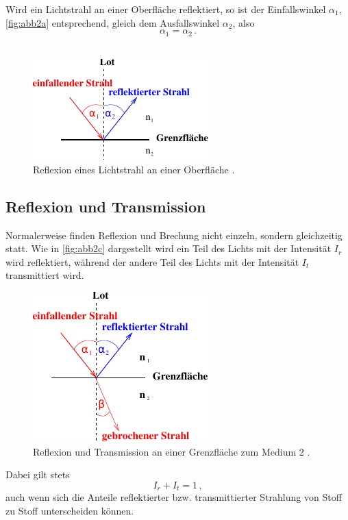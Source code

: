 Wird ein Lichtstrahl an einer Oberfläche reflektiert, so ist der Einfallswinkel $\alpha_1$, \autoref{fig:abb2a} entsprechend, gleich dem Ausfallswinkel $\alpha_2$, also
\begin{equation}
    \alpha_1 = \alpha_2 \,.
    \label{eq:reflexion}
\end{equation} \\

\begin{figure}
    \centering
    \includegraphics{figures/Abb_2a.pdf}
    \caption{Reflexion eines Lichtstrahl an einer Oberfläche \cite{ap02}.}
    \label{fig:abb2a}
\end{figure}

\subsection*{Reflexion und Transmission}

Normalerweise finden Reflexion und Brechung nicht einzeln, sondern gleichzeitig statt. Wie in \autoref{fig:abb2c} dargestellt wird ein Teil des Lichts mit der Intensität $I_r$ wird reflektiert, 
während der andere Teil des Lichts mit der Intensität $I_t$ transmittiert wird.

\begin{figure}
    \centering
    \includegraphics{figures/Abb_2c.pdf}
    \caption{Reflexion und Transmission an einer Grenzfläche zum Medium 2 \cite{ap02}.}
    \label{fig:abb2c}
\end{figure}

Dabei gilt stets
\begin{equation*}
    I_r + I_t = 1 \,,
\end{equation*}
auch wenn sich die Anteile reflektierter bzw. transmittierter Strahlung von Stoff zu Stoff unterscheiden können. \\

